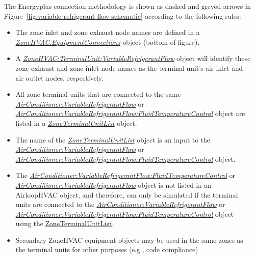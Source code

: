 The Energyplus connection methodology is shown as dashed and greyed arrows in Figure~\ref{fig:variable-refrigerant-flow-schematic} according to the following rules:

\begin{itemize}
\item
  The zone inlet and zone exhaust node names are defined in a \emph{\hyperref[zonehvacequipmentconnections]{ZoneHVAC:EquipmentConnections}} object (bottom of figure).
\item
  A \emph{\hyperref[zonehvacterminalunitvariablerefrigerantflow]{ZoneHVAC:TerminalUnit:VariableRefrigerantFlow}} object will identify these zone exhaust and zone inlet node names as the terminal unit's air inlet and air outlet nodes, respectively.
\item
  All zone terminal units that are connected to the same \emph{\hyperref[airconditionervariablerefrigerantflow]{AirConditioner:VariableRefrigerantFlow}} or \emph{\hyperref[airconditionervariablerefrigerantflowfluidtemperaturecontrol]{AirConditioner:VariableRefrigerantFlow:FluidTemperatureControl}} object are listed in a \emph{\hyperref[zoneterminalunitlist]{ZoneTerminalUnitList}} object.
\item
  The name of the \emph{\hyperref[zoneterminalunitlist]{ZoneTerminalUnitList}} object is an input to the \emph{\hyperref[airconditionervariablerefrigerantflow]{AirConditioner:VariableRefrigerantFlow}} or \emph{\hyperref[airconditionervariablerefrigerantflowfluidtemperaturecontrol]{AirConditioner:VariableRefrigerantFlow:FluidTemperatureControl}} object.
\item
  The \emph{\hyperref[airconditionervariablerefrigerantflowfluidtemperaturecontrol]{AirConditioner:VariableRefrigerantFlow:FluidTemperatureControl}} or \emph{\hyperref[airconditionervariablerefrigerantflow]{AirConditioner:VariableRefrigerantFlow}} object is not listed in an AirloopHVAC object, and therefore, can only be simulated if the terminal units are connected to the \emph{\hyperref[airconditionervariablerefrigerantflow]{AirConditioner:VariableRefrigerantFlow}} or \emph{\hyperref[airconditionervariablerefrigerantflowfluidtemperaturecontrol]{AirConditioner:VariableRefrigerantFlow:FluidTemperatureControl}} object using the \hyperref[zoneterminalunitlist]{ZoneTerminalUnitList}.
\item
  Secondary ZoneHVAC equipment objects may be used in the same zones as the terminal units for other purposes (e.g., code compliance)
\end{itemize}

